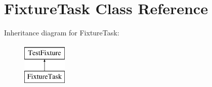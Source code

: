 \hypertarget{classFixtureTask}{\section{Fixture\-Task Class Reference}
\label{classFixtureTask}
}
Inheritance diagram for Fixture\-Task\-:\begin{figure}[H]
\begin{center}
\leavevmode
\includegraphics[height=2.000000cm]{classFixtureTask}
\end{center}
\end{figure}
